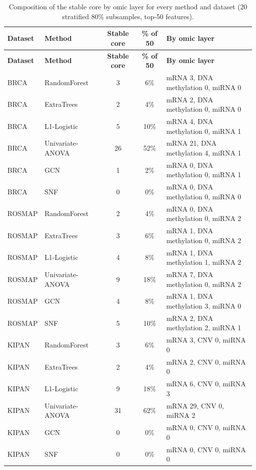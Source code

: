 \documentclass[utf8]{frontiers_suppmat}
\begin{document}
\begin{longtable}{llccp{5cm}}
\caption{Composition of the stable core by omic layer for every method and dataset (20 stratified 80\% subsamples, top-50 features).}\label{tab:S1}\\
\hline
\textbf{Dataset} & \textbf{Method} & \textbf{Stable core} & \textbf{\% of 50} & \textbf{By omic layer} \\
\hline
\endfirsthead
\hline
\textbf{Dataset} & \textbf{Method} & \textbf{Stable core} & \textbf{\% of 50} & \textbf{By omic layer} \\
\hline
\endhead
\hline
\endfoot
BRCA & RandomForest & 3 & 6\% & mRNA 3, DNA methylation 0, miRNA 0 \\
BRCA & ExtraTrees & 2 & 4\% & mRNA 2, DNA methylation 0, miRNA 0 \\
BRCA & L1-Logistic & 5 & 10\% & mRNA 4, DNA methylation 0, miRNA 1 \\
BRCA & Univariate-ANOVA & 26 & 52\% & mRNA 21, DNA methylation 4, miRNA 1 \\
BRCA & GCN & 1 & 2\% & mRNA 0, DNA methylation 0, miRNA 1 \\
BRCA & SNF & 0 & 0\% & mRNA 0, DNA methylation 0, miRNA 0 \\
ROSMAP & RandomForest & 2 & 4\% & mRNA 0, DNA methylation 0, miRNA 2 \\
ROSMAP & ExtraTrees & 3 & 6\% & mRNA 1, DNA methylation 0, miRNA 2 \\
ROSMAP & L1-Logistic & 4 & 8\% & mRNA 1, DNA methylation 1, miRNA 2 \\
ROSMAP & Univariate-ANOVA & 9 & 18\% & mRNA 7, DNA methylation 0, miRNA 2 \\
ROSMAP & GCN & 4 & 8\% & mRNA 1, DNA methylation 3, miRNA 0 \\
ROSMAP & SNF & 5 & 10\% & mRNA 2, DNA methylation 2, miRNA 1 \\
KIPAN & RandomForest & 3 & 6\% & mRNA 3, CNV 0, miRNA 0 \\
KIPAN & ExtraTrees & 2 & 4\% & mRNA 2, CNV 0, miRNA 0 \\
KIPAN & L1-Logistic & 9 & 18\% & mRNA 6, CNV 0, miRNA 3 \\
KIPAN & Univariate-ANOVA & 31 & 62\% & mRNA 29, CNV 0, miRNA 2 \\
KIPAN & GCN & 0 & 0\% & mRNA 0, CNV 0, miRNA 0 \\
KIPAN & SNF & 0 & 0\% & mRNA 0, CNV 0, miRNA 0 \\
\end{longtable}
\end{document}
